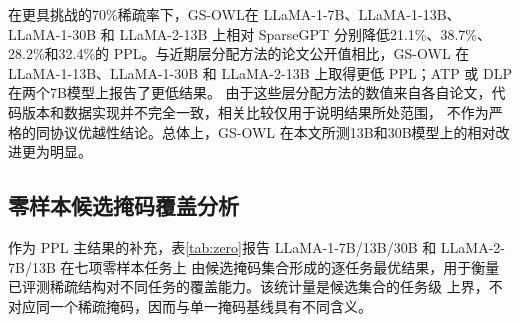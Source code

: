 \documentclass[UTF8,fontset=fandol]{ctexart}
\newcommand{\method}{GS-OWL}
\begin{document}
在更具挑战的70\%稀疏率下，\method 在 LLaMA-1-7B、LLaMA-1-13B、LLaMA-1-30B 和 LLaMA-2-13B 上相对
SparseGPT 分别降低21.1\%、38.7\%、28.2\%和32.4\%的 PPL。与近期层分配方法的论文公开值相比，GS-OWL 在
LLaMA-1-13B、LLaMA-1-30B 和 LLaMA-2-13B 上取得更低 PPL；ATP 或 DLP 在两个7B模型上报告了更低结果。
由于这些层分配方法的数值来自各自论文，代码版本和数据实现并不完全一致，相关比较仅用于说明结果所处范围，
不作为严格的同协议优越性结论。总体上，GS-OWL 在本文所测13B和30B模型上的相对改进更为明显。

\FloatBarrier
\subsection{零样本候选掩码覆盖分析}

作为 PPL 主结果的补充，表\ref{tab:zero}报告 LLaMA-1-7B/13B/30B 和 LLaMA-2-7B/13B 在七项零样本任务上
由候选掩码集合形成的逐任务最优结果，用于衡量已评测稀疏结构对不同任务的覆盖能力。该统计量是候选集合的任务级
上界，不对应同一个稀疏掩码，因而与单一掩码基线具有不同含义。
\end{document}

